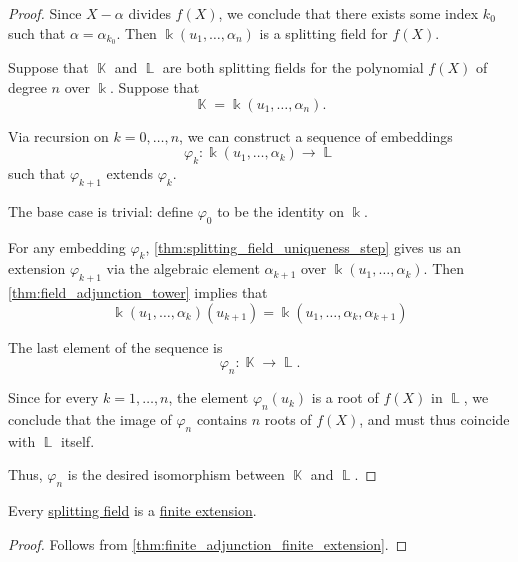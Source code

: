 \begin{proof}
  Since \( X - \alpha \) divides \( f(X) \), we conclude that there exists some index \( k_0 \) such that \( \alpha = \alpha_{k_0} \). Then \( \Bbbk(u_1, \ldots, \alpha_n) \) is a splitting field for \( f(X) \).

  \UniquenessSubProof Suppose that \( \BbbK \) and \( \BbbL \) are both splitting fields for the polynomial \( f(X) \) of degree \( n \) over \( \Bbbk \). Suppose that
  \begin{equation*}
    \BbbK = \Bbbk(u_1, \ldots, \alpha_n).
  \end{equation*}

  Via recursion on \( k = 0, \ldots, n \), we can construct a sequence of embeddings
  \begin{equation*}
    \varphi_k: \Bbbk(u_1, \ldots, \alpha_k) \to \BbbL
  \end{equation*}
  such that \( \varphi_{k+1} \) extends \( \varphi_k \).

  The base case is trivial: define \( \varphi_0 \) to be the identity on \( \Bbbk \).

  For any embedding \( \varphi_k \), \cref{thm:splitting_field_uniqueness_step} gives us an extension \( \varphi_{k+1} \) via the algebraic element \( \alpha_{k+1} \) over \( \Bbbk(u_1, \ldots, \alpha_k) \). Then \cref{thm:field_adjunction_tower} implies that
  \begin{equation*}
    \Bbbk(u_1, \ldots, \alpha_k)(u_{k+1})
    =
    \Bbbk(u_1, \ldots, \alpha_k, \alpha_{k+1})
  \end{equation*}

  The last element of the sequence is
  \begin{equation*}
    \varphi_n: \BbbK \to \BbbL.
  \end{equation*}

  Since for every \( k = 1, \ldots, n \), the element \( \varphi_n(u_k) \) is a root of \( f(X) \) in \( \BbbL \), we conclude that the image of \( \varphi_n \) contains \( n \) roots of \( f(X) \), and must thus coincide with \( \BbbL \) itself.

  Thus, \( \varphi_n \) is the desired isomorphism between \( \BbbK \) and \( \BbbL \).
\end{proof}

\begin{proposition}\label{thm:splitting_field_is_finite_extension}
  Every \hyperref[def:splitting_field]{splitting field} is a \hyperref[def:field_extension_degree]{finite extension}.
\end{proposition}
\begin{proof}
  Follows from \cref{thm:finite_adjunction_finite_extension}.
\end{proof}

